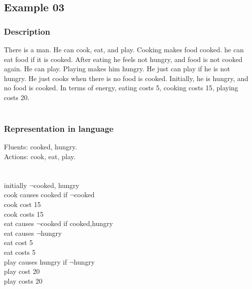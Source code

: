 \documentclass[11pt]{article}
\begin{document}
	\subsection{Example 03}
	\subsubsection{Description}\label{par:p103}
	There is a man. He can cook, eat, and play. Cooking makes food cooked. he can eat food if it is cooked. After eating he feels not hungry, and food is not cooked again. He can play. Playing makes him hungry. He just can play if he is not hungry. He just cooks when there is no food is cooked. Initially, he is hungry, and no food is cooked. In terms of energy, eating costs 5, cooking costs 15, playing costs 20.\\
	\\
	\subsubsection{Representation in language}\label{par:p203}
	Fluents: cooked, hungry.\\
	Actions: cook, eat, play.\\
	\\
	\\
	initially $\neg$cooked, hungry\\
	cook causes cooked if $\neg$cooked\\
	cook cost 15\\
	cook costs 15\\
	eat causes $\neg$cooked if cooked,hungry\\
	eat causes $\neg$hungry\\
	eat cost 5\\
	eat costs 5\\
	play causes hungry if $\neg$hungry\\
	play cost 20\\
	play costs 20\\
	\\
\end{document}
